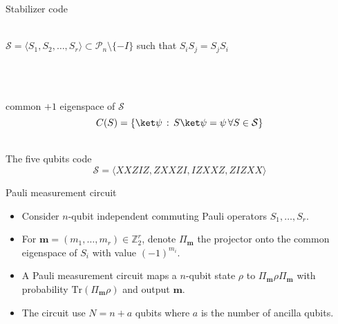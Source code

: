 \begin{frame}[c]{Stabilizer code}

  \centering
  \\[3mm]
  $
    \mathcal S 
    = \langle S_1, S_2, \ldots, S_r \rangle
    \subset \mathcal P_n \setminus \lbrace -I \rbrace
  $
  such that $S_i S_j = S_j S_i$

  \hfill\\
  \pause

  \\[3mm]
  common $+1$ eigenspace of $\mathcal S$
  \begin{equation*}
    C(S) = 
    \lbrace 
      \ket \psi 
      \, : \, 
      S \ket \psi = \psi 
      \, \forall S \in \mathcal S 
    \rbrace
  \end{equation*}

  \pause

  \\[3mm]
  The five qubits code
  \begin{equation*}
    \mathcal S =
    \langle
      XXZIZ,
      ZXXZI,
      IZXXZ,
      ZIZXX
    \rangle
  \end{equation*}

\end{frame}

\begin{frame}[c]{Pauli measurement circuit}
  \Large
  \begin{itemize}
    \item  
    Consider $n$-qubit independent commuting Pauli operators
    $S_1, \ldots, S_r$.
    \pause
    \item
    For $\boldsymbol{m} = (m_1, \ldots, m_r) \in \mathbb Z_2^r$,
    denote $\Pi_{\boldsymbol{m}}$ the projector onto the common eigenspace of $S_i$ 
    with value $(-1)^{m_i}$.
    \pause
    \item
    A Pauli measurement circuit maps a $n$-qubit state $\rho$ to
    $\Pi_{\boldsymbol{m}} \rho \Pi_{\boldsymbol{m}}$ with probability $\text{Tr}(\Pi_{\boldsymbol{m}}\rho)$
    and output $\boldsymbol{m}$.
    \pause
    \item
    The circuit use $N = n + a$ qubits where $a$ is the number of ancilla qubits.
  \end{itemize}
\end{frame}

